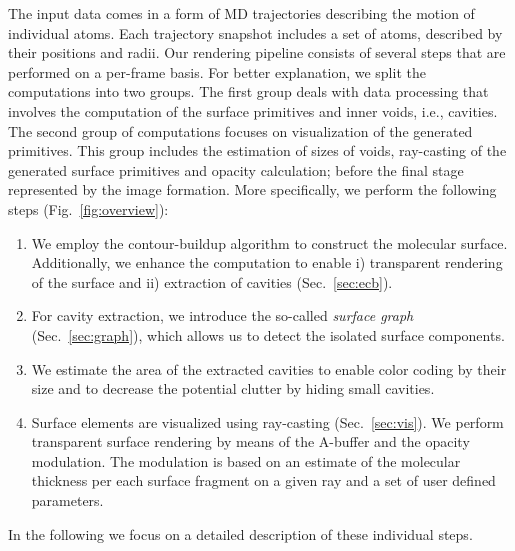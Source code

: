 The input data comes in a form of MD trajectories describing the motion of individual atoms. 
Each trajectory snapshot includes a set of atoms, described by their positions and radii. 
Our rendering pipeline consists of several steps that are performed on a per-frame basis. 
For better explanation, we split the computations into two groups. 
The first group deals with data processing that involves the computation of the surface primitives and inner voids, i.e., cavities.
The second group of computations focuses on visualization of the generated primitives. 
This group includes the estimation of sizes of voids, ray-casting of the generated surface primitives and opacity calculation; before the final stage represented by the image formation. More specifically, we perform the following steps (Fig.~\ref{fig:overview}):
	\begin{enumerate}
	  \item We employ the contour-buildup algorithm to construct the molecular surface. Additionally, we enhance the computation to enable i) transparent rendering of the surface and ii) extraction of cavities (Sec.~\ref{sec:ecb}).
		\item For cavity extraction, we introduce the so-called \textit{surface graph} (Sec.~\ref{sec:graph}), which allows us to detect the isolated surface components.
		\item We estimate the area of the extracted cavities to enable color coding by their size and to decrease the potential clutter by hiding small cavities.
		\item Surface elements are visualized using ray-casting (Sec.~\ref{sec:vis}). We perform transparent surface rendering by means of the A-buffer and the opacity modulation. The modulation is based on an estimate of the molecular thickness per each surface fragment on a given ray and a set of user defined parameters.
	\end{enumerate}
	
In the following we focus on a detailed description of these individual steps.